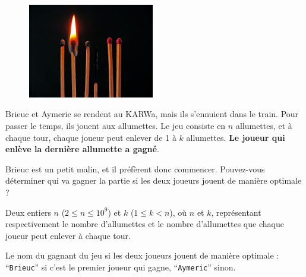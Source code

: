 \problemname{\problemyamlname}


\begin{figure}
	\centering
	\includegraphics[width=5.5cm]{allumettes.jpg}
\end{figure}
Brieuc et Aymeric se rendent au KARWa, mais ils s'ennuient dans le train. Pour passer le temps, ils jouent aux allumettes. Le jeu consiste en $n$ allumettes,
et à chaque tour, chaque joueur peut enlever de 1 à $k$ allumettes. \textbf{Le joueur qui enlève la dernière allumette a gagné}.

Brieuc est un petit malin, et il préfèrent donc commencer. Pouvez-vous déterminer qui va gagner la partie si les deux joueurs jouent de manière optimale ?

\begin{Input}
	Deux entiers $n$ ($2 \le n \le 10^9$) et $k$ ($1 \le k < n$), où $n$ et $k$, représentant respectivement le nombre d'allumettes et le nombre d'allumettes que chaque joueur peut enlever à chaque tour.
\end{Input}

\begin{Output}
	Le nom du gagnant du jeu si les deux joueurs jouent de manière optimale : ``\verb|Brieuc|'' si c'est le premier joueur qui gagne, ``\verb|Aymeric|'' sinon.
\end{Output}
